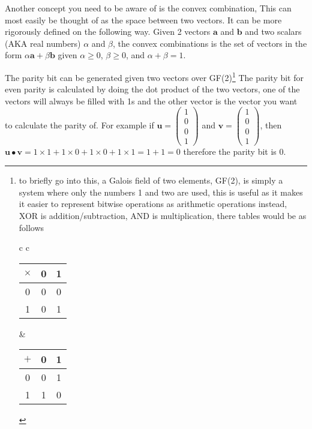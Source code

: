   Another concept you need to be aware of is the convex combination, This can most easily be thought of as the space between two vectors. It can be more rigorously defined on the following way. Given 2 vectors $\textbf{a}$ and $\textbf{b}$ and two scalars (AKA real numbers) $\alpha$ and $\beta$, the convex combinations is the set of vectors in the form $ \alpha\textbf{a} + \beta\textbf{b} $ given $\alpha \geq 0$, $\beta \geq 0$, and $\alpha + \beta = 1$.

  The parity bit can be generated given two vectors over GF(2)\footnote{to briefly go into this, a Galois field of two elements, GF(2), is simply a system where only the numbers 1 and two are used, this is useful as it makes it easier to represent bitwise operations as arithmetic operations instead, XOR is addition/subtraction, AND is multiplication, there tables would be as follows
  	\begin{table}[H]
  		\begin{tabular}{c c}
	  		\begin{tabular}{c | c | c}
	  			$\times$ & 0 & 1 \\\hline
	  			0 & 0 & 0 \\\hline
	  			1 & 0 & 1 \\
	  		\end{tabular}
	  		&
	  		\begin{tabular}{c | c | c}
	  			$+$ & 0 & 1 \\\hline
	  			0 & 0 & 1 \\\hline
	  			1 & 1 & 0 \\
	  		\end{tabular}
	  	\end{tabular}
  	\end{table}} The parity bit for even parity is calculated by doing the dot product of the two vectors, one of the vectors will always be filled with 1s and the other vector is the vector you want to calculate the parity of. For example if $\textbf{u} = \left( \begin{smallmatrix} 1 \\ 0 \\ 0 \\ 1 \end{smallmatrix}\right)$ and $\textbf{v} = \left( \begin{smallmatrix} 1 \\ 0 \\ 0 \\ 1 \end{smallmatrix}\right)$, then $\textbf{u}\bullet\textbf{v} = 1\times1 + 1\times0 + 1\times0 + 1\times1 = 1 + 1 = 0 $ therefore the parity bit is 0.
